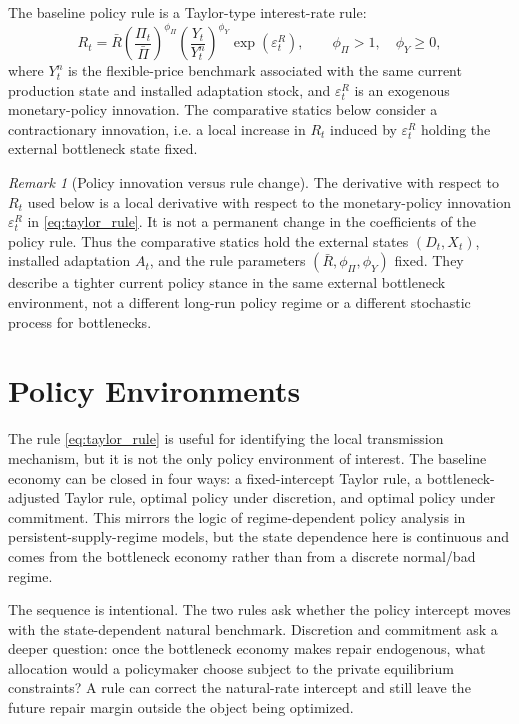 ﻿\documentclass[12pt]{article}
\theoremstyle{remark}
\newtheorem{remark}{Remark}
\begin{document}
The baseline policy rule is a Taylor-type interest-rate rule:
\begin{equation}
    R_t
    =
    \bar R
    \left(\frac{\Pi_t}{\bar\Pi}\right)^{\phi_\Pi}
    \left(\frac{Y_t}{Y_t^n}\right)^{\phi_Y}
    \exp(\varepsilon_t^R),
    \qquad
    \phi_\Pi>1,\quad \phi_Y\ge 0,
    \label{eq:taylor_rule}
\end{equation}
where $Y_t^n$ is the flexible-price benchmark associated with the same current production state and
installed adaptation stock, and $\varepsilon_t^R$ is an exogenous monetary-policy innovation. The comparative
statics below consider a contractionary innovation, i.e. a local increase in $R_t$ induced by
$\varepsilon_t^R$ holding the external bottleneck state fixed.

\begin{remark}[Policy innovation versus rule change]\label{rem:policy_innovation}
The derivative with respect to $R_t$ used below is a local derivative with respect to the
monetary-policy innovation $\varepsilon_t^R$ in \eqref{eq:taylor_rule}. It is not a permanent
change in the coefficients of the policy rule. Thus the comparative statics hold the external
states $(D_t,X_t)$, installed adaptation $A_t$, and the rule parameters
$(\bar R,\phi_\Pi,\phi_Y)$ fixed. They describe a tighter current policy stance in the same
external bottleneck environment, not a different long-run policy regime or a different stochastic
process for bottlenecks.
\end{remark}

\section{Policy Environments}

The rule \eqref{eq:taylor_rule} is useful for identifying the local transmission mechanism, but it
is not the only policy environment of interest. The baseline economy can be closed in four ways:
a fixed-intercept Taylor rule, a bottleneck-adjusted Taylor rule, optimal policy under discretion,
and optimal policy under commitment. This mirrors the logic of regime-dependent policy analysis in
persistent-supply-regime models, but the state dependence here is continuous and comes from the
bottleneck economy rather than from a discrete normal/bad regime.

The sequence is intentional. The two rules ask whether the policy intercept moves with the
state-dependent natural benchmark. Discretion and commitment ask a deeper question: once the
bottleneck economy makes repair endogenous, what allocation would a policymaker choose subject to
the private equilibrium constraints? A rule can correct the natural-rate intercept and still leave
the future repair margin outside the object being optimized.
\end{document}
